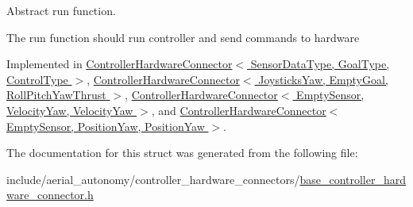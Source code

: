 Abstract run function. 

The run function should run controller and send commands to hardware 

Implemented in \hyperlink{classControllerHardwareConnector_afb46464434a3a5881ecc1091f58bbd61}{Controller\-Hardware\-Connector$<$ Sensor\-Data\-Type, Goal\-Type, Control\-Type $>$}, \hyperlink{classControllerHardwareConnector_afb46464434a3a5881ecc1091f58bbd61}{Controller\-Hardware\-Connector$<$ Joysticks\-Yaw, Empty\-Goal, Roll\-Pitch\-Yaw\-Thrust $>$}, \hyperlink{classControllerHardwareConnector_afb46464434a3a5881ecc1091f58bbd61}{Controller\-Hardware\-Connector$<$ Empty\-Sensor, Velocity\-Yaw, Velocity\-Yaw $>$}, and \hyperlink{classControllerHardwareConnector_afb46464434a3a5881ecc1091f58bbd61}{Controller\-Hardware\-Connector$<$ Empty\-Sensor, Position\-Yaw, Position\-Yaw $>$}.



The documentation for this struct was generated from the following file\-:\begin{DoxyCompactItemize}
\item 
include/aerial\-\_\-autonomy/controller\-\_\-hardware\-\_\-connectors/\hyperlink{base__controller__hardware__connector_8h}{base\-\_\-controller\-\_\-hardware\-\_\-connector.\-h}\end{DoxyCompactItemize}
